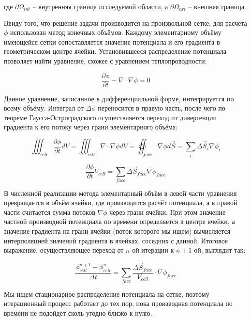 \documentclass[a4paper,12pt]{article}
\begin{document}
\noindent
где $\partial \Omega_{int}$ -- внутренняя граница исследуемой области, а $\partial \Omega_{ext}$ -- внешняя граница.

Ввиду того, что решение задачи производится на произвольной сетке, для расчёта $\phi$ использован метод конечных объёмов. Каждому элементарному объёму имеющейся сетки сопоставляется значение потенциала и его градиента в геометрическом центре ячейки. Установившееся распределение потенциала позволяет найти уравнение, схожее с уравнением теплопроводности:

\begin{equation}
    \frac{\partial \phi}{\partial t} - \nabla \cdot \nabla \phi = 0
\end{equation}

Данное уравнение, записанное в дифференциальной форме, интегрируется по всему объёму. Интеграл от $\Delta \phi$ переносится в правую часть, после чего по теореме Гаусса-Остроградского осуществляется переход от дивергенции градиента к его потоку через грани элементарного объёма:

\begin{equation}
    \iiint_{cell} \frac{\partial \phi}{\partial t} dV = \iiint_{cell} \nabla \cdot \nabla \phi dV = \oiint_{face} \nabla \phi d \vec S = \sum_i \Delta \vec S_i \nabla \phi_i
\end{equation}

\begin{equation}
    \frac{\partial \phi}{\partial t} V_{cell} = \sum_{face} \Delta \vec S_{face} \nabla \phi_{face}
\end{equation}

В численной реализации метода элементарный объём в левой части уравнения превращается в объём ячейки, где производится расчёт потенциала, а в правой части считается сумма потоков $\nabla \phi$ через грани ячейки. При этом значение частной производной потенциала по времени определяется в центре ячейки, а значение градиента на грани ячейки (поток которого мы ищем) вычисляется интерполяцией значений градиента в ячейках, соседних с данной.
Итоговое выражение, осуществляющее переход от $n$-ой итерации к $n+1$-ой, выглядит так:

\begin{equation}
    \frac{\phi_{cell}^{n+1} - \phi_{cell}^{n}}{\Delta t} = \sum_{face} \frac{\Delta \vec S_{face}}{V_{cell}} \cdot \nabla \phi_{face}
\end{equation}

Мы ищем стационарное распределение потенциала на сетке, поэтому итерационный процесс работает до тех пор, пока производная потенциала по времени не подойдет сколь угодно близко к нулю.
\end{document}
